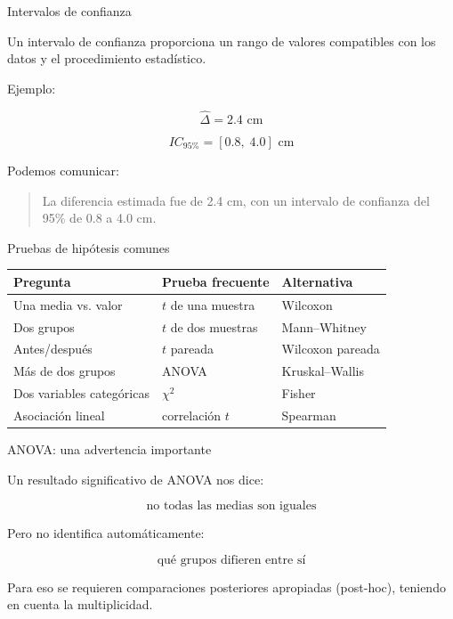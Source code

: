 
\begin{frame}{Intervalos de confianza}

Un intervalo de confianza proporciona un rango de valores
compatibles con los datos y el procedimiento estadístico.

Ejemplo:

\[
\widehat{\Delta}=2.4\text{ cm}
\]

\[
IC_{95\%}=[0.8,\;4.0]\text{ cm}
\]

Podemos comunicar:

\begin{quote}
La diferencia estimada fue de 2.4 cm, con un intervalo de confianza
del 95\% de 0.8 a 4.0 cm.
\end{quote}

\end{frame}

\begin{frame}{Pruebas de hipótesis comunes}

\begin{center}
\begin{tabular}{lll}
\toprule
\textbf{Pregunta} & \textbf{Prueba frecuente} & \textbf{Alternativa}\\
\midrule
Una media vs. valor & $t$ de una muestra & Wilcoxon\\
Dos grupos & $t$ de dos muestras & Mann--Whitney\\
Antes/después & $t$ pareada & Wilcoxon pareada\\
Más de dos grupos & ANOVA & Kruskal--Wallis\\
Dos variables categóricas & $\chi^2$ & Fisher\\
Asociación lineal & correlación $t$ & Spearman\\
\bottomrule
\end{tabular}
\end{center}

\end{frame}

\begin{frame}{ANOVA: una advertencia importante}

Un resultado significativo de ANOVA nos dice:

\[
\boxed{\text{no todas las medias son iguales}}
\]

Pero no identifica automáticamente:

\[
\text{qué grupos difieren entre sí}
\]

Para eso se requieren comparaciones posteriores apropiadas
(post-hoc), teniendo en cuenta la multiplicidad.

\end{frame}

